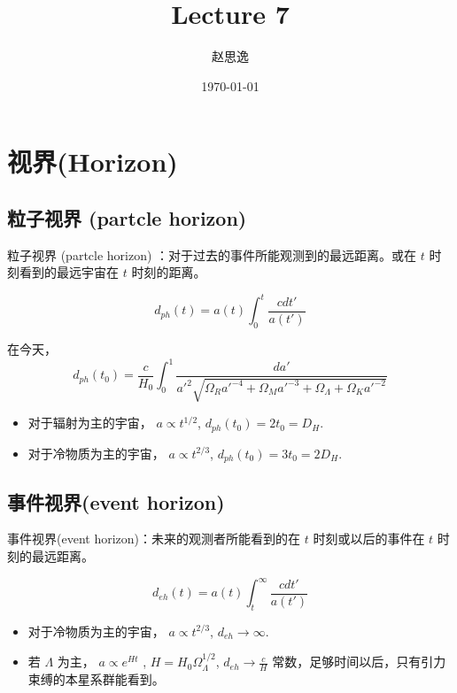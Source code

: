 \documentclass[12pt]{ctexart}
\title{Lecture 7}
\author{赵思逸}
\date{\today}
\begin{document}
\maketitle

\section{视界(Horizon)}

\subsection{粒子视界 (partcle horizon)}
粒子视界 (partcle horizon) ：对于过去的事件所能观测到的最远距离。或在 $t$ 时刻看到的最远宇宙在 $t$ 时刻的距离。

\begin{equation}
    d_{ph}(t) = a(t) \int_0^t \frac{cdt'}{a(t')} 
\end{equation}

在今天，
\begin{equation}
    d_{ph}(t_0) = \frac{c}{H_0}\int_0^1 \frac{da'}{a'^2 \sqrt{\Omega_R a'^{-4}+\Omega_M a'^{-3}+\Omega_\Lambda+\Omega_K a'^{-2}} }
\end{equation}

\begin{itemize}
    \item 对于辐射为主的宇宙， $a\propto t^{1/2}$, $d_{ph}(t_0)=2t_0 = D_H$.
    \item 对于冷物质为主的宇宙， $a\propto t^{2/3}$, $d_{ph}(t_0)=3t_0 = 2 D_H$. 
\end{itemize}

\subsection{事件视界(event horizon)}
事件视界(event horizon)：未来的观测者所能看到的在 $t$ 时刻或以后的事件在 $t$ 时刻的最远距离。

\begin{equation}
    d_{eh}(t) = a(t) \int_t^\infty \frac{cdt'}{a(t')} 
\end{equation}

\begin{itemize}
    \item 对于冷物质为主的宇宙， $a\propto t^{2/3}$, $d_{eh}\to \infty$. 
    \item 若 $\Lambda$ 为主， $a\propto e^{Ht}$ , $H=H_0 \Omega_\Lambda^{1/2}$,  $d_{eh}\to \frac{c}{H}$ 常数，足够时间以后，只有引力束缚的本星系群能看到。 
\end{itemize}
\end{document}
